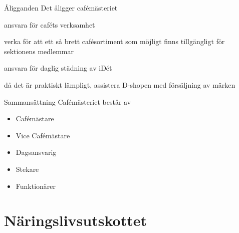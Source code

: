 \documentclass[pdfbookmarks,a4paper,11pt]{article}
\newlength{\itemcollength}
\newenvironment{reglemlista}{%
  \begin{list}{}{%
      \setlength{\labelwidth}{\itemcollength}%
      \setlength{\leftmargin}{\labelwidth + \labelsep}%
      \renewcommand{\makelabel}[1]{%
        \raisebox{0pt}[1ex][0pt]{%
          \makebox[\labelwidth][l]{%
            \parbox[t]{\itemcollength}{%
              \raggedright\hspace{0pt}##1}}}\hfill}%
      }}{%
  \end{list}}
\begin{document}
\begin{reglemlista}

	\item[Åligganden]
	Det åligger cafémästeriet
	\begin{attlista}
		\item ansvara för caféts verksamhet
		\item verka för att ett så brett cafésortiment som möjligt finns tillgängligt för sektionens medlemmar
		\item ansvara för daglig städning av iDét
		\item då det är praktiskt lämpligt, assistera D-shopen med försäljning av märken
	\end{attlista}

	\item[Sammansättning]
	Cafémästeriet består av
	\begin{itemize}
		\item Cafémästare
		\item Vice Cafémästare
		\item Dagsansvarig
		\item Stekare
		\item Funktionärer
	\end{itemize}

\end{reglemlista}

\section{Näringslivsutskottet}
\end{document}
